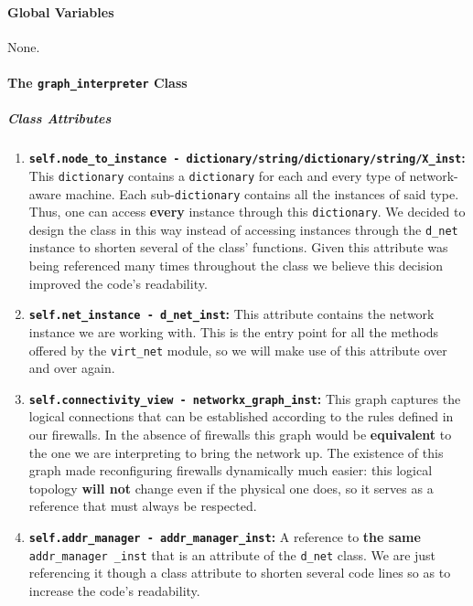     \paragraph{Global Variables}
        None.

    \paragraph{The \texttt{graph\_interpreter} Class}
        \subparagraph{Class Attributes}
            \begin{enumerate}
                \item \textbf{\texttt{self.node\_to\_instance - dictionary/string/dictionary/string/X\_inst}:} This \texttt{dictionary} contains a \texttt{dictionary} for each and every type of network-aware machine. Each sub-\texttt{dictionary} contains all the instances of said type. Thus, one can access \textbf{every} instance through this \texttt{dictionary}. We decided to design the class in this way instead of accessing instances through the \texttt{d\_net} instance to shorten several of the class' functions. Given this attribute was being referenced many times throughout the class we believe this decision improved the code's readability.
                \item \textbf{\texttt{self.net\_instance - d\_net\_inst}:} This attribute contains the network instance we are working with. This is the entry point for all the methods offered by the \texttt{virt\_net} module, so we will make use of this attribute over and over again.
                \item \textbf{\texttt{self.connectivity\_view - networkx\_graph\_inst}:}  This graph captures the logical connections that can be established according to the rules defined in our firewalls. In the absence of firewalls this graph would be \textbf{equivalent} to the one we are interpreting to bring the network up. The existence of this graph made reconfiguring firewalls dynamically much easier: this logical topology \textbf{will not} change even if the physical one does, so it serves as a reference that must always be respected.
                \item \textbf{\texttt{self.addr\_manager - addr\_manager\_inst}:} A reference to \textbf{the same} \texttt{addr\_manager \_inst} that is an attribute of the \texttt{d\_net} class. We are just referencing it though a class attribute to shorten several code lines so as to increase the code's readability.
            \end{enumerate}

